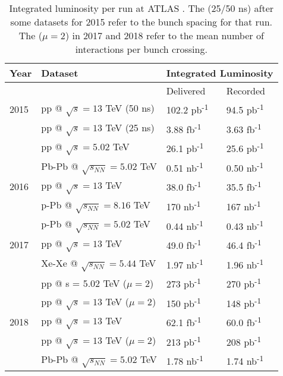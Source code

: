 \begin{table} \centering
\begin{tabular}{|l|l|l|l|}
\hline
Year & Dataset                              & \multicolumn{2}{c|}{Integrated Luminosity}  \\
\hline
     &                                      & Delivered    & Recorded    \\
\hline
2015 & pp @ $\sqrt{s} = 13$ TeV (50 ns)     &  102.2  pb\textsuperscript{-1}   & 94.5  pb\textsuperscript{-1}  \\
     & pp @ $\sqrt{s} = 13$ TeV (25 ns)     &  3.88   fb\textsuperscript{-1}   & 3.63  fb\textsuperscript{-1}  \\
     & pp @ $\sqrt{s} = 5.02$ TeV           &  26.1   pb\textsuperscript{-1}   & 25.6  pb\textsuperscript{-1}  \\
     & Pb-Pb @ $\sqrt{s_{NN}} = 5.02$ TeV   &  0.51   nb\textsuperscript{-1}   &  0.50 nb\textsuperscript{-1}  \\
\hline
2016 & pp @ $\sqrt{s} = 13$ TeV             &  38.0   fb\textsuperscript{-1}   & 35.5  fb\textsuperscript{-1}  \\
     & p-Pb @ $\sqrt{s_{NN}} = 8.16$ TeV    &  170    nb\textsuperscript{-1}   & 167   nb\textsuperscript{-1}  \\
     & p-Pb @ $\sqrt{s_{NN}} = 5.02$ TeV    &  0.44   nb\textsuperscript{-1}   &  0.43 nb\textsuperscript{-1}  \\
\hline
2017 & pp @ $\sqrt{s} = 13$ TeV             &  49.0   fb\textsuperscript{-1}   & 46.4  fb\textsuperscript{-1}  \\
     & Xe-Xe @ $\sqrt{s_{NN}} = 5.44$ TeV   &  1.97   nb\textsuperscript{-1}   &  1.96 nb\textsuperscript{-1}  \\
     & pp @ s = 5.02 TeV ($\mu=2$)          &  273    pb\textsuperscript{-1}   & 270   pb\textsuperscript{-1}  \\
     & pp @ $\sqrt{s} = 13$ TeV ($\mu=2$)   &  150    pb\textsuperscript{-1}   & 148   pb\textsuperscript{-1}  \\
\hline
2018 & pp @ $\sqrt{s} = 13$ TeV             &  62.1   fb\textsuperscript{-1}   & 60.0  fb\textsuperscript{-1}  \\
     & pp @ $\sqrt{s} = 13$ TeV ($\mu=2$)   &  213    pb\textsuperscript{-1}   & 208   pb\textsuperscript{-1}  \\
     & Pb-Pb @ $\sqrt{s_{NN}} = 5.02$ TeV   &  1.78   nb\textsuperscript{-1}   &  1.74 nb\textsuperscript{-1}  \\ 
\hline
\end{tabular}
\caption{
    Integrated luminosity per run at ATLAS \cite{data_quality}.
    The (25/50 ns) after some datasets for 2015 refer to the bunch spacing for that run.
    The ($\mu=2$) in 2017 and 2018 refer to the mean number of interactions per bunch crossing.
}
\label{tab:dataset_lum}

\end{table}
